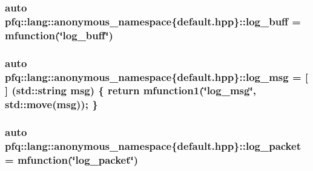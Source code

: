 \hypertarget{namespacepfq_1_1lang_1_1anonymous__namespace_02default_8hpp_03_ac16d4c4b496e6e882901d84ded462101}{
\subsubsection[{log\+\_\+buff}]{\setlength{\rightskip}{0pt plus 5cm}auto pfq\+::lang\+::anonymous\+\_\+namespace\{default.\+hpp\}\+::log\+\_\+buff = {\bf mfunction}(\char`\"{}log\+\_\+buff\char`\"{})}}\label{namespacepfq_1_1lang_1_1anonymous__namespace_02default_8hpp_03_ac16d4c4b496e6e882901d84ded462101}
\hypertarget{namespacepfq_1_1lang_1_1anonymous__namespace_02default_8hpp_03_a82e76226844f043aac9a2dd01615c9bb}{
\subsubsection[{log\+\_\+msg}]{\setlength{\rightskip}{0pt plus 5cm}auto pfq\+::lang\+::anonymous\+\_\+namespace\{default.\+hpp\}\+::log\+\_\+msg = \mbox{[}$\,$\mbox{]} (std\+::string msg) \{ return {\bf mfunction1}(\char`\"{}log\+\_\+msg\char`\"{}, std\+::move(msg)); \}}}\label{namespacepfq_1_1lang_1_1anonymous__namespace_02default_8hpp_03_a82e76226844f043aac9a2dd01615c9bb}
\hypertarget{namespacepfq_1_1lang_1_1anonymous__namespace_02default_8hpp_03_aed6076a98aece625738cbda3689183e2}{
\subsubsection[{log\+\_\+packet}]{\setlength{\rightskip}{0pt plus 5cm}auto pfq\+::lang\+::anonymous\+\_\+namespace\{default.\+hpp\}\+::log\+\_\+packet = {\bf mfunction}(\char`\"{}log\+\_\+packet\char`\"{})}}\label{namespacepfq_1_1lang_1_1anonymous__namespace_02default_8hpp_03_aed6076a98aece625738cbda3689183e2}

